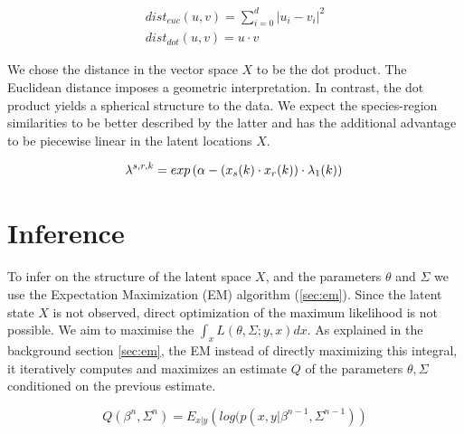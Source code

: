 \documentclass[mscthesis]{usiinfthesis}
\begin{document}
\begin{eqfloat}
\begin{equation}
\begin{array}{l}
dist_{euc}(u, v) = \sum_{i=0}^d |u_i - v_i|^2 \\
dist_{dot}(u, v) = u \cdot v
\end{array}
\label{eq:distance_latentspace}
\end{equation}
\end{eqfloat}

We chose the distance in the vector space $X$ to be the dot product. The Euclidean distance imposes a geometric interpretation. In contrast, the dot product yields a spherical structure to the data. We expect the species-region similarities to be better described by the latter and has the additional advantage to be piecewise linear in the latent locations $X$.


\begin{eqfloat}
\begin{equation}
\lambda^{s, r, k} = exp\left(\alpha-(x_s(k) \cdot x_r(k)) \cdot \lambda_1(k) \right) \\
\label{eq:ourmodel_lambda}
\end{equation}
\end{eqfloat}

\section{Inference}
To infer on the structure of the latent space $X$, and the parameters $\theta$  and $\Sigma$ we use the Expectation Maximization (EM) algorithm (\ref{sec:em}). Since the latent state $X$ is not observed, direct optimization of the maximum likelihood is not possible. We aim to maximise the $\int_x L(\theta, \Sigma ; y, x) dx$. As explained in the background section \ref{sec:em}, the EM instead of directly maximizing this integral, it iteratively computes and maximizes an estimate $Q$ of the parameters $\theta, \Sigma$ conditioned on the previous estimate. 

\begin{eqfloat}
\begin{equation}
Q(\beta^{n}, \Sigma^{n}) = E_{x|y} \left( log(p(x, y | \beta^{n-1}, \Sigma^{n-1}) \right)
\end{equation}
\label{eq:expectation_maximization}
\end{eqfloat}
\end{document}
